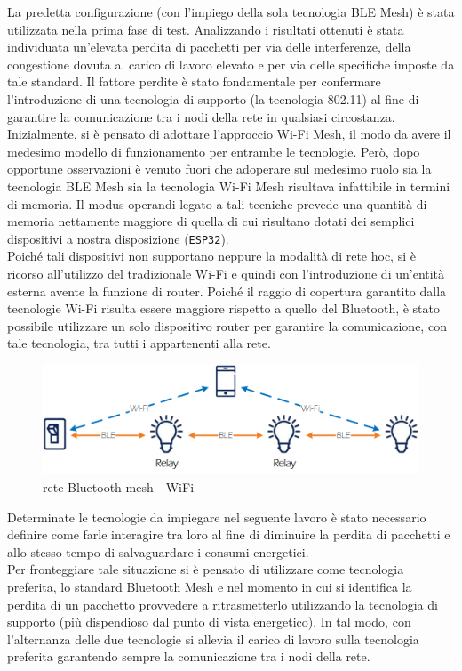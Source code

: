 \noindent La predetta configurazione (con l'impiego della sola tecnologia BLE Mesh) è stata utilizzata nella prima fase di test. Analizzando i risultati ottenuti è stata individuata un'elevata perdita di pacchetti per via delle interferenze, della congestione dovuta al carico di lavoro elevato e per via delle specifiche imposte da tale standard. Il fattore perdite è stato fondamentale per confermare l'introduzione di una tecnologia di supporto (la tecnologia 802.11) al fine di garantire la comunicazione tra i nodi della rete in qualsiasi circostanza.\\
Inizialmente, si è pensato di adottare l'approccio Wi-Fi Mesh, il modo da avere il medesimo modello di funzionamento per entrambe le tecnologie. Però, dopo opportune osservazioni è venuto fuori che adoperare sul medesimo ruolo sia la tecnologia BLE Mesh sia la tecnologia Wi-Fi Mesh risultava infattibile in termini di memoria. Il modus operandi legato a tali tecniche prevede una quantità di memoria nettamente maggiore di quella di cui risultano dotati dei semplici dispositivi a nostra disposizione (\texttt{ESP32}). \\
Poiché tali dispositivi non supportano neppure la modalità di rete hoc, si è ricorso all'utilizzo del tradizionale Wi-Fi e quindi con l'introduzione di un'entità esterna avente la funzione di router. Poiché il raggio di copertura garantito dalla tecnologie Wi-Fi risulta essere maggiore rispetto a quello del Bluetooth, è stato possibile utilizzare un solo dispositivo router per garantire la comunicazione, con tale tecnologia, tra tutti i appartenenti alla rete.\\

\begin{figure}[!ht]
    \centering
    \includegraphics[width = \textwidth]{images/BLE_WiFi.png}
    \caption{rete Bluetooth mesh - WiFi}
    \label{fig:mesh_network_wifi}
\end{figure}

\noindent Determinate le tecnologie da impiegare nel seguente lavoro è stato necessario definire come farle interagire tra loro al fine di diminuire la perdita di pacchetti e allo stesso tempo di salvaguardare i consumi energetici.\\
Per fronteggiare tale situazione si è pensato di utilizzare come tecnologia preferita, lo standard Bluetooth Mesh e nel momento in cui si identifica la perdita di un pacchetto provvedere a ritrasmetterlo utilizzando la tecnologia di supporto (più dispendioso dal punto di vista energetico). In tal modo, con l'alternanza delle due tecnologie si allevia il carico di lavoro sulla tecnologia preferita garantendo sempre la comunicazione tra i nodi della rete.\\

